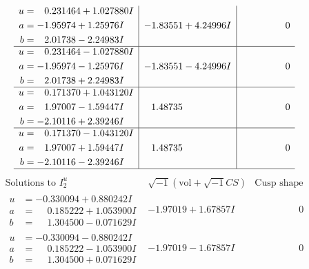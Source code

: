 \documentclass[1p]{elsarticle_modified}
\theoremstyle{definition}
\newcommand{\I}{\sqrt{-1}}
\begin{document}
$$\begin{array}{c|c|c}
\begin{aligned}
u &= \phantom{-}0.231464 + 1.027880 I \\
a &= -1.95974 + 1.25976 I \\
b &= \phantom{-}2.01738 - 2.24983 I\end{aligned}
 & -1.83551 + 4.24996 I & \phantom{-0.000000 } 0 \\ \hline\begin{aligned}
u &= \phantom{-}0.231464 - 1.027880 I \\
a &= -1.95974 - 1.25976 I \\
b &= \phantom{-}2.01738 + 2.24983 I\end{aligned}
 & -1.83551 - 4.24996 I & \phantom{-0.000000 } 0 \\ \hline\begin{aligned}
u &= \phantom{-}0.171370 + 1.043120 I \\
a &= \phantom{-}1.97007 - 1.59447 I \\
b &= -2.10116 + 2.39246 I\end{aligned}
 & \phantom{-}1.48735\phantom{ +0.000000I} & \phantom{-0.000000 } 0 \\ \hline\begin{aligned}
u &= \phantom{-}0.171370 - 1.043120 I \\
a &= \phantom{-}1.97007 + 1.59447 I \\
b &= -2.10116 - 2.39246 I\end{aligned}
 & \phantom{-}1.48735\phantom{ +0.000000I} & \phantom{-0.000000 } 0\\
 \hline 
 \end{array}$$\newpage$$\begin{array}{c|c|c}  
\text{Solutions to }I^u_{2}& \I (\text{vol} + \sqrt{-1}CS) & \text{Cusp shape}\\
 \hline 
\begin{aligned}
u &= -0.330094 + 0.880242 I \\
a &= \phantom{-}0.185222 + 1.053900 I \\
b &= \phantom{-}1.304500 - 0.071629 I\end{aligned}
 & -1.97019 + 1.67857 I & \phantom{-0.000000 } 0 \\ \hline\begin{aligned}
u &= -0.330094 - 0.880242 I \\
a &= \phantom{-}0.185222 - 1.053900 I \\
b &= \phantom{-}1.304500 + 0.071629 I\end{aligned}
 & -1.97019 - 1.67857 I & \phantom{-0.000000 } 0 \\ \hline\begin{aligned}

\end{aligned}
\end{array}$$
\end{document}
